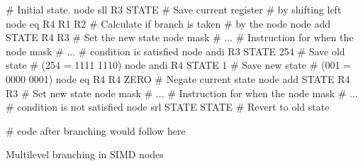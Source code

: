 \begin{listing}[h]
  \centering
  \begin{lenacode}
    # Initial state.
    node sll R3 STATE      # Save current register
                           # by shifting left
    node eq R4 R1 R2       # Calculate if branch is taken
                           # by the node
    node add STATE R4 R3   # Set the new state
      node mask # ... # Instruction for when the 
      node mask # ... # condition is satisfied
    node andi R3 STATE 254 # Save old state
                           # (254 = 1111 1110)
    node andi R4 STATE 1   # Save new state
                           # (001 = 0000 0001)
    node eq R4 R4 ZERO     # Negate current state
    node add STATE R4 R3   # Set new state
      node mask # ... # Instruction for when the 
      node mask # ... # condition is not satisfied
    node srl STATE STATE   # Revert to old state

    # code after branching would follow here
  \end{lenacode}
  \caption[Multilevel branching]{Multilevel branching in SIMD nodes}
  \label{lst:multilevel-branching}
\end{listing}
